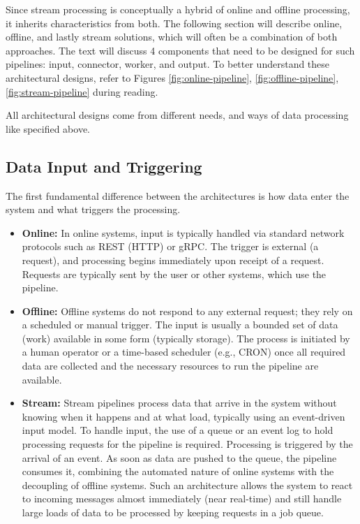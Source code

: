 Since stream processing is conceptually a hybrid of online and offline processing, it inherits characteristics from both. The following section will describe online, offline, and lastly stream solutions, which will often be a combination of both approaches. The text will discuss 4 components that need to be designed for such pipelines: input, connector, worker, and output. To better understand these architectural designs, refer to Figures \ref{fig:online-pipeline}, \ref{fig:offline-pipeline}, \ref{fig:stream-pipeline} during reading.

All architectural designs come from different needs, and ways of data processing like specified above.

\subsection{Data Input and Triggering}
The first fundamental difference between the architectures is how data enter the system and what triggers the processing.

\begin{itemize}
    \item \textbf{Online:} In online systems, input is typically handled via standard network protocols such as REST (HTTP) or gRPC. The trigger is external (a request), and processing begins immediately upon receipt of a request. Requests are typically sent by the user or other systems, which use the pipeline.
    \item \textbf{Offline:} Offline systems do not respond to any external request; they rely on a scheduled or manual trigger. The input is usually a bounded set of data (work) available in some form (typically storage). The process is initiated by a human operator or a time-based scheduler (e.g., CRON) once all required data are collected and the necessary resources to run the pipeline are available.
    \item \textbf{Stream:} Stream pipelines process data that arrive in the system without knowing when it happens and at what load, typically using an event-driven input model. To handle input, the use of a queue or an event log to hold processing requests for the pipeline is required. Processing is triggered by the arrival of an event. As soon as data are pushed to the queue, the pipeline consumes it, combining the automated nature of online systems with the decoupling of offline systems. Such an architecture allows the system to react to incoming messages almost immediately (near real-time) and still handle large loads of data to be processed by keeping requests in a job queue.

\cite{kleppmann_designing_2017, reis_fundamentals_2022}
\end{itemize}

